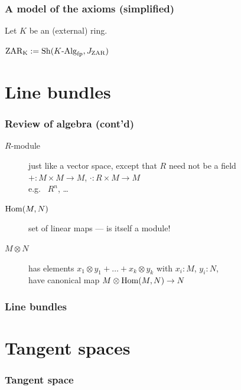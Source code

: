 \documentclass[aspectratio=1610]{beamer}
\begin{document}
\begin{frame}
  \frametitle{A model of the axioms (simplified)}

  Let $K$ be an (external) ring.

  \bigskip
  $\mathrm{ZAR_K} := \mathrm{Sh}(K\text{-}\mathrm{Alg}_{\mathrm{fp}}, J_{\mathrm{ZAR}})$
\end{frame}

\appendix

\section{Line bundles}

\begin{frame}
  \frametitle{Review of algebra (cont'd)}

  \begin{description}
    \item[$R$-module]
      just like a vector space, except that $R$ need not be a field\\
      ${+} : M \times M \to M$, ${\cdot} : R \times M \to M$\\
      {
      e.g.\ %
      $R^n$,
      \dots}
      \pause%
    \bigskip
    \item[$\mathrm{Hom}(M, N)$]
      set of linear maps
      --- is itself a module!
      \pause%
    \bigskip
    \item[$M \otimes N$]
      has elements $x_1 \otimes y_1 + \dots + x_k \otimes y_k$ with $x_i : M$, $y_i : N$,\\
      have canonical map $M \otimes \mathrm{Hom}(M, N) \to N$
  \end{description}
\end{frame}

\begin{frame}
  \frametitle{Line bundles}
\end{frame}

\section{Tangent spaces}

\begin{frame}
  \frametitle{Tangent space}
\end{frame}
\end{document}
